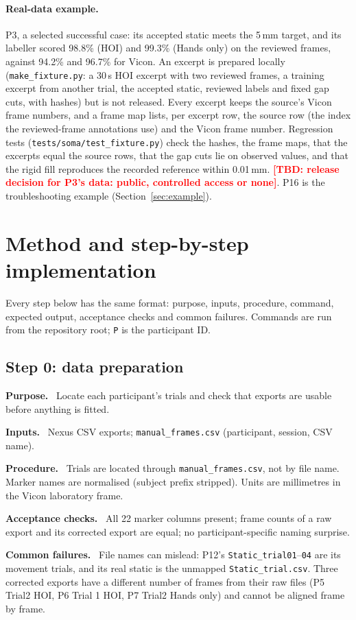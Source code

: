 \documentclass[11pt,a4paper]{article}
\newcommand{\tbd}[1]{\textcolor{red}{\textbf{[TBD: #1]}}}
\newcommand{\field}[1]{\par\smallskip\noindent\textbf{#1.}\ }
\begin{document}
\paragraph{Real-data example.} P3, a selected successful case: its accepted static meets the 5\,mm target, and its
labeller scored 98.8\% (HOI) and 99.3\% (Hands only) on the reviewed frames, against 94.2\% and 96.7\% for Vicon. An
excerpt is prepared locally (\texttt{make\_fixture.py}: a 30\,s HOI excerpt with two reviewed frames, a training
excerpt from another trial, the accepted static, reviewed labels and fixed gap cuts, with hashes) but is not released.
Every excerpt keeps the source's Vicon frame numbers, and a frame map lists, per excerpt row, the source row (the index
the reviewed-frame annotations use) and the Vicon frame number. Regression tests (\texttt{tests/soma/test\_fixture.py})
check the hashes, the frame maps, that the excerpts equal the source rows, that the gap cuts lie on observed values, and
that the rigid fill reproduces the recorded reference within 0.01\,mm.
\tbd{release decision for P3's data: public, controlled access or none}. P16 is the troubleshooting example
(Section~\ref{sec:example}).

\section{Method and step-by-step implementation}\label{sec:workflow}
Every step below has the same format: purpose, inputs, procedure, command, expected output, acceptance checks and
common failures. Commands are run from the repository root; \texttt{P} is the participant ID.

\subsection{Step 0: data preparation}
\field{Purpose} Locate each participant's trials and check that exports are usable before anything is fitted.
\field{Inputs} Nexus CSV exports; \texttt{manual\_frames.csv} (participant, session, CSV name).
\field{Procedure} Trials are located through \texttt{manual\_frames.csv}, not by file name. Marker names are
normalised (subject prefix stripped). Units are millimetres in the Vicon laboratory frame.
\field{Acceptance checks} All 22 marker columns present; frame counts of a raw export and its corrected export are
equal; no participant-specific naming surprise.
\field{Common failures} File names can mislead: P12's \texttt{Static\_trial01}--\texttt{04} are its movement trials,
and its real static is the unmapped \texttt{Static\_trial.csv}. Three corrected exports have a different number of
frames from their raw files (P5 Trial2 HOI, P6 Trial 1 HOI, P7 Trial2 Hands only) and cannot be aligned frame by frame.
\end{document}
